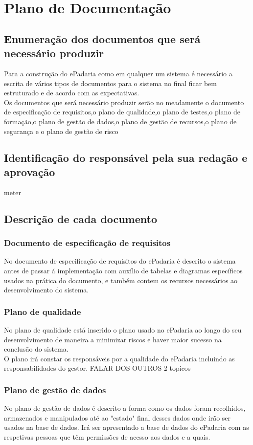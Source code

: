 \chapter{Plano de Documentação}
\label{plano_de_documentacao}

\section{Enumeração dos documentos que será necessário produzir}
Para a construção do ePadaria como em qualquer um sistema é necessário a escrita de vários tipos de documentos para o sistema no final ficar bem estruturado e de acordo com as expectativas.\\
Os documentos que será necessário produzir serão no
meadamente o documento de especificação de requisitos,o plano de qualidade,o plano de testes,o plano de formação,o plano de gestão de dados,o plano de gestão de recursos,o plano de segurança e o plano de gestão de risco
\section{Identificação do responsável pela sua redação e aprovação}
meter

\section{Descrição de cada documento}
\subsection{Documento de especificação de requisitos}
No documento de especificação de requisitos do ePadaria é descrito o sistema antes de passar á implementação com auxílio de tabelas e diagramas específicos usados na prática do documento, e também contem os recursos necessários ao desenvolvimento do sistema. 
\subsection{Plano de qualidade}
No plano de qualidade está inserido o plano usado no ePadaria ao longo do seu desenvolvimento de maneira a minimizar riscos e haver maior sucesso na conclusão do sistema. \\ O plano irá constar os responsáveis por a qualidade do ePadaria incluindo as responsabilidades do gestor.
FALAR DOS OUTROS 2 topicos
\subsection{Plano de gestão de dados}
No plano de gestão de dados é descrito a forma como os dados foram recolhidos, armazenados e manipulados até ao "estado" final desses dados onde irão ser usados na base de dados. Irá ser apresentado a base de dados do ePadaria com as respetivas pessoas que têm permissões de acesso aos dados e a quais.
